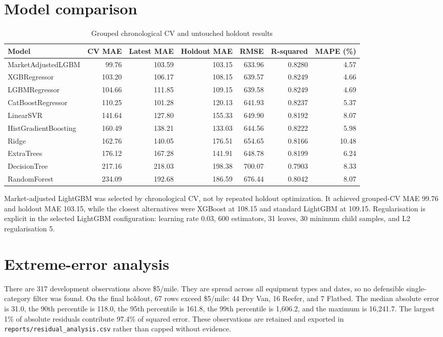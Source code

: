 \documentclass[11pt,a4paper]{article}
\begin{document}
\section*{Model comparison}
\begin{table}[h]
\centering
\small
\caption{Grouped chronological CV and untouched holdout results}
\begin{tabular}{lrrrrrr}
\toprule
Model & CV MAE & Latest MAE & Holdout MAE & RMSE & R-squared & MAPE (\%)\\
\midrule
MarketAdjustedLGBM & 99.76 & 103.59 & 103.15 & 633.96 & 0.8280 & 4.57\\
XGBRegressor & 103.20 & 106.17 & 108.15 & 639.57 & 0.8249 & 4.66\\
LGBMRegressor & 104.66 & 111.85 & 109.15 & 639.58 & 0.8249 & 4.69\\
CatBoostRegressor & 110.25 & 101.28 & 120.13 & 641.93 & 0.8237 & 5.37\\
LinearSVR & 141.64 & 127.80 & 155.33 & 649.90 & 0.8192 & 8.07\\
HistGradientBoosting & 160.49 & 138.21 & 133.03 & 644.56 & 0.8222 & 5.98\\
Ridge & 162.76 & 140.05 & 176.51 & 654.65 & 0.8166 & 10.48\\
ExtraTrees & 176.12 & 167.28 & 141.91 & 648.78 & 0.8199 & 6.24\\
DecisionTree & 217.16 & 218.03 & 198.38 & 700.07 & 0.7903 & 8.33\\
RandomForest & 234.09 & 192.68 & 186.59 & 676.44 & 0.8042 & 8.07\\
\bottomrule
\end{tabular}
\end{table}

Market-adjusted LightGBM was selected by chronological CV, not by repeated
holdout optimization. It achieved grouped-CV MAE 99.76 and holdout MAE 103.15,
while the closest alternatives were XGBoost at 108.15 and standard LightGBM at
109.15. Regularisation is explicit in the selected LightGBM configuration:
learning rate 0.03, 600 estimators, 31 leaves, 30 minimum child samples, and
L2 regularisation 5.

\section*{Extreme-error analysis}
There are 317 development observations above \$5/mile. They are spread across
all equipment types and dates, so no defensible single-category filter was
found. On the final holdout, 67 rows exceed \$5/mile: 44 Dry Van, 16 Reefer,
and 7 Flatbed. The median absolute error is 31.0, the 90th percentile is
118.0, the 95th percentile is 161.8, the 99th percentile is 1,606.2, and the
maximum is 16,241.7. The largest 1\% of absolute residuals contribute 97.4\%
of squared error. These observations are retained and exported in
\texttt{reports/residual\_analysis.csv} rather than capped without evidence.
\end{document}
